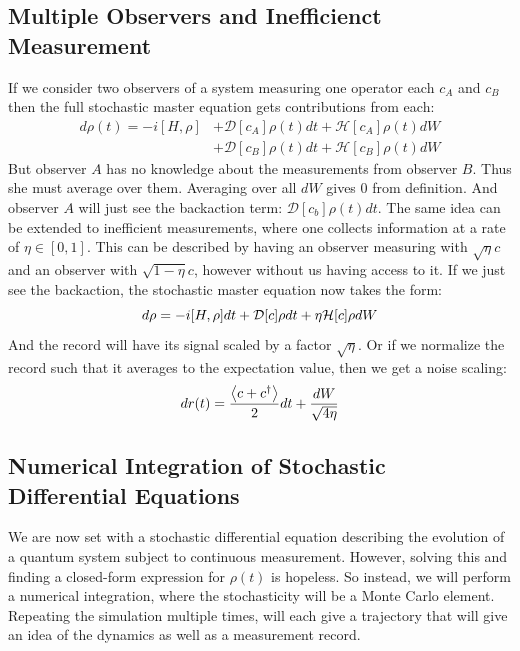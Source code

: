 \subsection{Multiple Observers and Inefficienct Measurement}
If we consider two observers of a system measuring one operator each $c_A$ and $c_B$ then the full stochastic master equation gets contributions from each:
\begin{align*}
    d\rho(t) = -i[H, \rho] &+ \mathcal{D}[c_A]\rho(t) dt + \mathcal{H}[c_A]\rho(t) dW \\
                           &+ \mathcal{D}[c_B]\rho(t) dt + \mathcal{H}[c_B]\rho(t) dW
\end{align*}
But observer $A$ has no knowledge about the measurements from observer $B$. Thus she must average over them. Averaging over all $dW$ gives $0$ from definition. And observer $A$ will just see the backaction term: $\mathcal{D}[c_b] \rho(t) dt$. The same idea can be extended to inefficient measurements, where one collects information at a rate of $\eta\in[0, 1]$. This can be described by having an observer measuring with $\sqrt{\eta} c$ and an observer with $\sqrt{1 - \eta}c$, however without us having access to it. If we just see the backaction, the stochastic master equation now takes the form:
\begin{equation}
    d\rho = -i \comm{H}{\rho}dt + \mathcal{D}[c]\rho dt + \eta \mathcal{H}[c] \rho dW
\end{equation}
And the record will have its signal scaled by a factor $\sqrt{\eta}$. Or if we normalize the record such that it averages to the expectation value, then we get a noise scaling:
\begin{equation}
    dr(t) = \frac{\expval{c + c^\dagger}}{2}dt + \frac{dW}{\sqrt{4\eta}}
\end{equation}

\subsection{Numerical Integration of Stochastic Differential Equations}
We are now set with a stochastic differential equation describing the evolution of a quantum system subject to continuous measurement. However, solving this and finding a closed-form expression for $\rho(t)$ is hopeless. So instead, we will perform a numerical integration, where the stochasticity will be a Monte Carlo element. Repeating the simulation multiple times, will each give a trajectory that will give an idea of the dynamics as well as a measurement record. 

